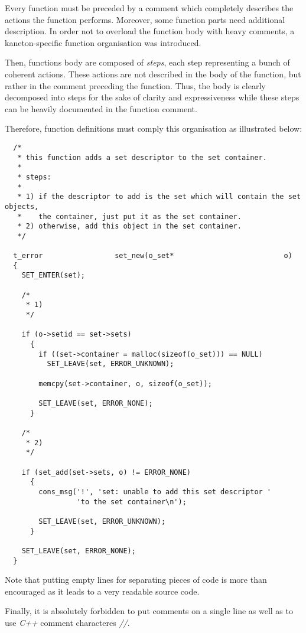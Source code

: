 Every function must be preceded by a comment which completely describes the
actions the function performs. Moreover, some function parts need additional
description. In order not to overload the function body with heavy comments,
a kaneton-specific function organisation was introduced.

Then, functions body are composed of \textit{steps}, each step representing
a bunch of coherent actions. These actions are not described in the body
of the function, but rather in the comment preceding the function. Thus,
the body is clearly decomposed into steps for the sake of clarity and
expressiveness while these steps can be heavily documented in the
function comment.

Therefore, function definitions must comply this organisation as illustrated
below:

\begin{verbatim}
  /*
   * this function adds a set descriptor to the set container.
   *
   * steps:
   *
   * 1) if the descriptor to add is the set which will contain the set objects,
   *    the container, just put it as the set container.
   * 2) otherwise, add this object in the set container.
   */

  t_error                 set_new(o_set*                          o)
  {
    SET_ENTER(set);

    /*
     * 1)
     */

    if (o->setid == set->sets)
      {
        if ((set->container = malloc(sizeof(o_set))) == NULL)
          SET_LEAVE(set, ERROR_UNKNOWN);

        memcpy(set->container, o, sizeof(o_set));

        SET_LEAVE(set, ERROR_NONE);
      }

    /*
     * 2)
     */

    if (set_add(set->sets, o) != ERROR_NONE)
      {
        cons_msg('!', 'set: unable to add this set descriptor '
                 'to the set container\n');

        SET_LEAVE(set, ERROR_UNKNOWN);
      }

    SET_LEAVE(set, ERROR_NONE);
  }
\end{verbatim}

Note that putting empty lines for separating pieces of code is more than
encouraged as it leads to a very readable source code.

Finally, it is absolutely forbidden to put comments on a single line
as well as to use \textit{C++} comment characteres \textit{//}.

